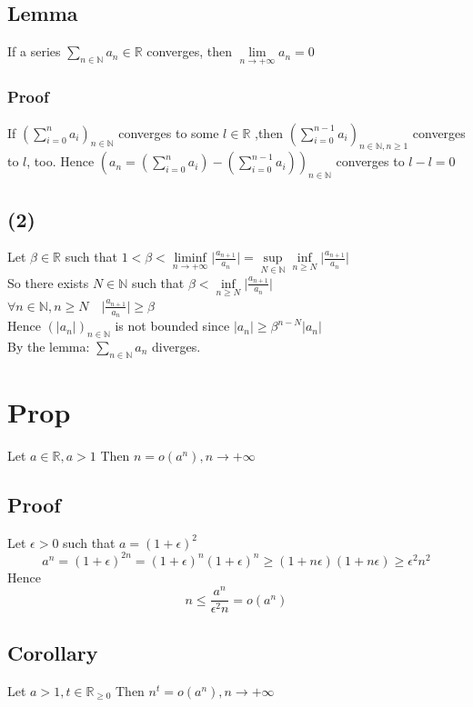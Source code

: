 \documentclass{book}
\begin{document}
\subsection{Lemma}
If a series $\sum\limits_{n\in \mathbb{N} }a_n \in\mathbb{R} $ converges, then $\lim\limits_{n\rightarrow+\infty}a_n=0$
\subsubsection*{Proof}
If $(\sum\limits_{i=0}^na_i)_{n\in \mathbb{N} }$ converges to some $l\in\mathbb{R} $ ,then $(\sum\limits_{i=0}^{n-1}a_i)_{n\in \mathbb{N},n\geq 1 }$ converges to $l$, too. Hence $\left(a_n=\left(\sum\limits_{i=0}^na_i\right)-\left(\sum\limits_{i=0}^{n-1}a_i\right)\right)_{n\in\mathbb{N} }$ converges to $l-l=0$
\subsection{(2)}Let $\beta\in \mathbb{R} $ such that $1<\beta<\liminf\limits_{n\rightarrow+\infty}\lvert\frac{a_{n+1}}{a_n}\rvert=\sup\limits_{N\in\mathbb{N} }\inf\limits_{n\geq N}\lvert\frac{a_{n+1}}{a_n}\rvert$\\
So there exists $N\in\mathbb{N} $ such that $\beta< \inf\limits_{n\geq N}\lvert \frac{a_{n+1}}{a_n}\rvert$\\
$\forall n\in \mathbb{N} ,n\geq N\quad \lvert \frac{a_{n+1}}{a_n}\rvert\geq\beta$\\
Hence $(\lvert a_n\rvert)_{n\in \mathbb{N} }$ is not bounded since $\lvert a_n\rvert\geq\beta^{n-N}\lvert a_n\rvert $\\
By the lemma: $\sum\limits_{n\in\mathbb{N} }a_n$ diverges.

\section{Prop}
Let $a\in \mathbb{R} ,a>1$ Then $n=o(a^n),n\rightarrow +\infty$
\subsection*{Proof}
Let $\epsilon>0$ such that $a=(1+\epsilon)^2$
$$a^n=(1+\epsilon)^{2n}=(1+\epsilon)^n(1+\epsilon)^n\geq(1+n\epsilon)(1+n\epsilon)\geq\epsilon^2n^2$$
Hence
$$n\leq\frac{a^n}{\epsilon^2n}=o(a^n)$$
\subsection{Corollary}
Let $a>1,t\in \mathbb{R} _{\geq 0}$ Then $n^t=o(a^n),n\rightarrow+\infty$
\end{document}
